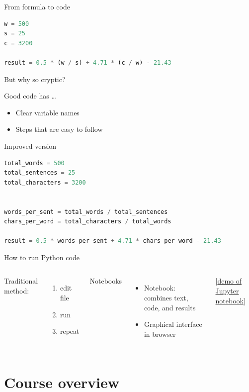 \documentclass[aspectratio=169,usenames,dvipsnames]{beamer}
\begin{document}
\begin{frame}[fragile]{From formula to code}
\begin{lstlisting}[language=python]
w = 500
s = 25
c = 3200

result = 0.5 * (w / s) + 4.71 * (c / w) - 21.43
\end{lstlisting}

\pause But why so cryptic?

    Good code has \dots

\begin{itemize}
    \item Clear variable names
    \item Steps that are easy to follow
\end{itemize}
\end{frame}

\begin{frame}[fragile]{Improved version}
\begin{lstlisting}[language=python]
total_words = 500
total_sentences = 25
total_characters = 3200


words_per_sent = total_words / total_sentences
chars_per_word = total_characters / total_words

result = 0.5 * words_per_sent + 4.71 * chars_per_word - 21.43
\end{lstlisting}
\end{frame}


\begin{frame}{How to run Python code}
	\begin{columns}
			Traditional method:
			\begin{enumerate}
				\item edit file
				\item run
				\item repeat
			\end{enumerate}
			Notebooks
			\begin{itemize}
				\item Notebook: combines text, code, and results
				\item Graphical interface in browser
			\end{itemize}
            [\href{http://mybinder.org/v2/gh/binder-examples/requirements/master}{demo of Jupyter notebook}]
	\end{columns}
\end{frame}



\section{Course overview}
\frame{\tableofcontents[currentsection]}
\end{document}
